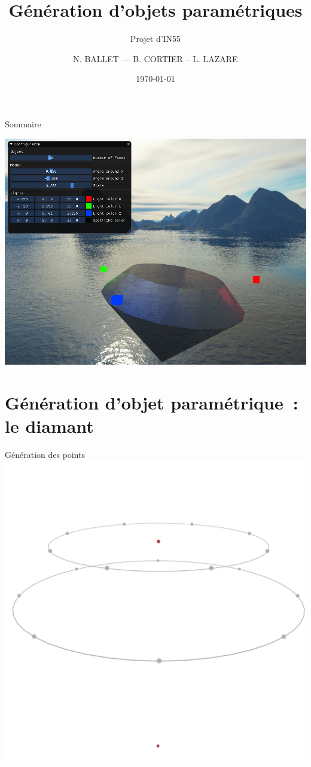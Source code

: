 \documentclass[11pt]{beamer}
\author{N. BALLET — B. CORTIER – L. LAZARE}
\institute[]{UTBM}
\title{Génération d'objets paramétriques}
\subtitle{Projet d'IN55}
\date{\today{}}
\begin{document}
\begin{frame}
    \titlepage{}
\end{frame}

\begin{frame}{Sommaire}
    \tableofcontents

    {\centering \includegraphics[height=0.7\textheight]{screenshot_software_4}}
\end{frame}

\section{Génération d'objet paramétrique~: le diamant}

\begin{frame}{Génération des points}
    {\centering \includegraphics[height=0.95\textheight]{Maillage/circles}}
\end{frame}
\end{document}
